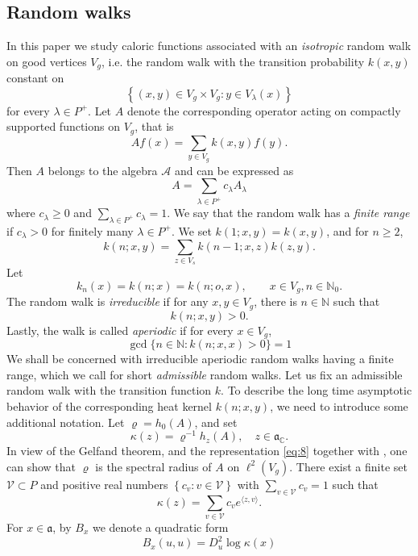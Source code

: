 \documentclass[11pt]{amsart}
\newcommand{\NN}{\mathbb{N}}
\theoremstyle{plain}
\theoremstyle{definition}
\numberwithin{equation}{section}
\begin{document}
\subsection{Random walks}
In this paper we study caloric functions associated with an \emph{isotropic} random walk on good vertices $V_g$, i.e. the random 
walk with the transition probability $k(x, y)$ constant on 
\[
	\left\{(x, y) \in V_g \times V_g: y \in V_\lambda(x)\right\}
\]
for every $\lambda \in P^+$. Let $A$ denote the corresponding operator acting on compactly supported functions on $V_g$,
that is
\[
	A f(x) = \sum_{y \in V_g} k(x, y) f(y).
\]
Then $A$ belongs to the algebra $\mathscr{A}$ and can be expressed as
\begin{equation}
	\label{eq:8}
	A = \sum_{\lambda \in P^+} c_\lambda A_\lambda
\end{equation}
where $c_\lambda \geqslant 0$ and $\sum_{\lambda \in P^+} c_\lambda = 1$. We say that the random walk has a \emph{finite range} 
if $c_{\lambda}>0$ for finitely many $\lambda \in P^{+}$. We set $k(1 ; x, y)=k(x, y)$, and for $n \geqslant 2$,
\[
	k(n ; x, y)=\sum_{z \in V_s} k(n-1 ; x, z) k(z, y) .
\]
Let
\[
	k_n(x) = k(n; x) = k(n; o, x), \qquad x \in V_g, n \in \NN_0.
\]
The random walk is \emph{irreducible} if for any $x, y \in V_g$, there is $n \in \mathbb{N}$ such that
\[
	k(n ; x, y)>0 .
\]
Lastly, the walk is called \emph{aperiodic} if for every $x \in V_g$,
\[
	\operatorname{gcd}\{n \in \mathbb{N}: k(n ; x, x)>0\}=1
\]
We shall be concerned with irreducible aperiodic random walks having a finite range, which we call for short
\emph{admissible} random walks. Let us fix an admissible random walk with the transition function $k$. To describe the long time
asymptotic behavior of the corresponding heat kernel $k(n; x, y)$, we need to introduce some additional notation. Let 
$\varrho = h_0(A)$, and set
\[
	\kappa(z) = \varrho^{-1}  h_z(A), \quad z \in \mathfrak{a}_{\mathbb{C}}.
\]
In view of the Gelfand theorem, and the representation \eqref{eq:8} together with \cite[Theorem 6.5]{park2}, one can show that
$\varrho$ is the spectral radius of $A$ on $\ell^2(V_g)$. There exist a finite set $\mathcal{V} \subset P$ and positive real 
numbers $\left\{c_v: v \in \mathcal{V}\right\}$ with $\sum_{v \in \mathcal{V}} c_v = 1$ such that
\[
	\kappa(z)=\sum_{v \in \mathcal{V}} c_v e^{\langle z, v\rangle}.
\]
For $x \in \mathfrak{a}$, by $B_x$ we denote a quadratic form 
\begin{equation}
	\label{eq:7}
	B_x(u, u)=D_u^2 \log \kappa(x)
\end{equation}
\end{document}
